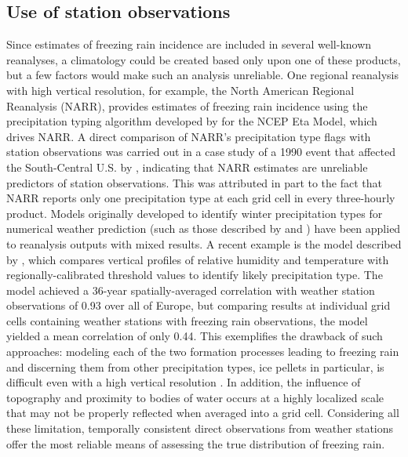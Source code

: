 \documentclass[twocol]{ametsoc}
\begin{document}
\subsection{Use of station observations}
Since estimates of freezing rain incidence are included in several well-known reanalyses, a climatology could be created based only upon one of these products, but a few factors would make such an analysis unreliable. One regional reanalysis with high vertical resolution, for example, the North American Regional Reanalysis (NARR), provides estimates of freezing rain incidence using the precipitation typing algorithm developed by \citet{baldwin1993development} for the NCEP Eta Model, which drives NARR. A direct comparison of NARR's precipitation type flags with station observations was carried out in a case study of a 1990 event that affected the South-Central U.S. by \citet{blunden2011138}, indicating that NARR estimates are unreliable predictors of station observations. This was attributed in part to the fact that NARR reports only one precipitation type at each grid cell in every three-hourly product. Models originally developed to identify winter precipitation types for numerical weather prediction (such as those described by \citet{cortinas2002probabilistic} and \citet{mullens2017multialgorithm}) have been applied to reanalysis outputs with mixed results. A recent example is the model described by \citet{kamarainen2017method}, which compares vertical profiles of relative humidity and temperature with regionally-calibrated threshold values to identify likely precipitation type. The model achieved a 36-year spatially-averaged correlation with weather station observations of 0.93 over all of Europe, but comparing results at individual grid cells containing weather stations with freezing rain observations, the model yielded a mean correlation of only 0.44. This exemplifies the drawback of such approaches: modeling each of the two formation processes leading to freezing rain and discerning them from other precipitation types, ice pellets in particular, is difficult even with a high vertical resolution \citep{reeves2014sources}. In addition, the influence of topography and proximity to bodies of water occurs at a highly localized scale that may not be properly reflected when averaged into a grid cell. Considering all these limitation, temporally consistent direct observations from weather stations offer the most reliable means of assessing the true distribution of freezing rain.
\end{document}
